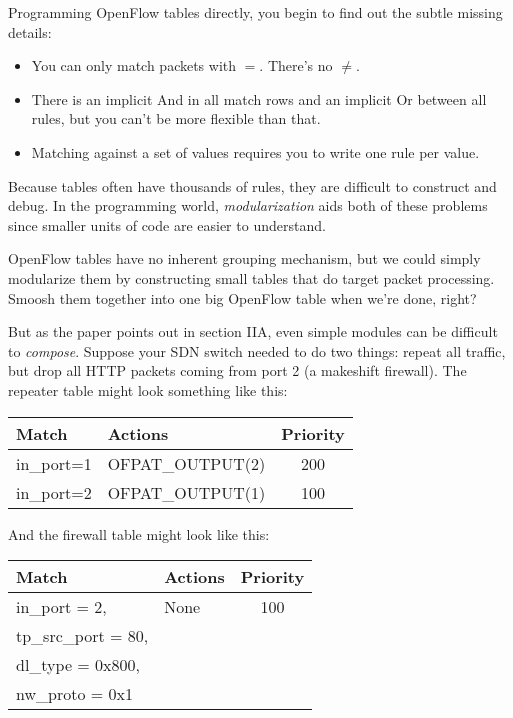Programming OpenFlow tables directly, you begin to find out the subtle missing details:

\begin{itemize}
\item You can only match packets with $=$.   There's no $\neq$.
\item There is an implicit And in all match rows and an implicit Or between all rules, but you can't be 
more flexible than that.    
\item Matching against a set of values requires you to write one rule per value.  
\end{itemize}

Because tables often have thousands of rules, they are difficult to construct and debug.  
In the programming world, \emph{modularization} aids both of these problems since smaller units of code
are easier to understand.  

OpenFlow tables have no inherent grouping mechanism, but we could simply modularize them by 
constructing small tables that do target packet processing.  Smoosh them together
into one big OpenFlow table when we're done, right?  

But as the paper \citet{frenetic} points out in section IIA, even simple modules can be difficult
to \emph{compose}.   Suppose your SDN switch needed to do two things: repeat all traffic, but drop all
HTTP packets coming from port 2 (a makeshift firewall).  The repeater table might look something like this:

\bigskip
\begin{tabularx}{4in}{|l|l|c|}
\hline\hline
Match & Actions & Priority
\\ \hline
in\_port=1 & OFPAT\_OUTPUT(2) & 200
\\ \hline
in\_port=2 & OFPAT\_OUTPUT(1) & 100
\\ \hline\hline
\end{tabularx}

\bigskip

And the firewall table might look like this:

\bigskip
\begin{tabularx}{4in}{|l|l|c|}
\hline\hline
Match & Actions & Priority
\\ \hline
in\_port = 2, & None & 100
\\
tp\_src\_port = 80, &  & 
\\
dl\_type = 0x800, & &
\\
nw\_proto = 0x1 & &
\\ \hline\hline
\end{tabularx}


